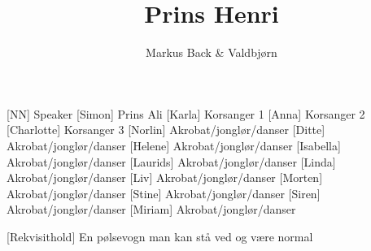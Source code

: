 \documentclass[a4paper,11pt]{article}
\title{Prins Henri}
\author{Markus Back \& Valdbjørn}
\begin{document}
\maketitle

\begin{roles}
    [NN] Speaker
    [Simon] Prins Ali
    [Karla] Korsanger 1
    [Anna] Korsanger 2
    [Charlotte] Korsanger 3
    [Norlin] Akrobat/jonglør/danser
    [Ditte] Akrobat/jonglør/danser
    [Helene] Akrobat/jonglør/danser
    [Isabella] Akrobat/jonglør/danser
    [Laurids] Akrobat/jonglør/danser
    [Linda] Akrobat/jonglør/danser
    [Liv] Akrobat/jonglør/danser
    [Morten] Akrobat/jonglør/danser
    [Stine] Akrobat/jonglør/danser
    [Siren] Akrobat/jonglør/danser
    [Miriam] Akrobat/jonglør/danser
\end{roles}

\begin{props}
	[Rekvisithold] En pølsevogn man kan stå ved og være normal   
\end{props}
\end{document}
